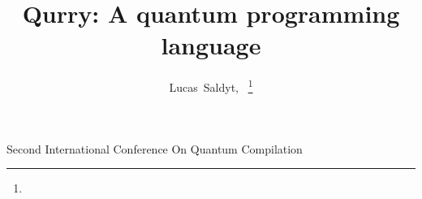 \documentclass[journal]{IEEEtran}
\begin{document}
%
\title{Qurry: A quantum programming language}
%
%
%

\author{Lucas~Saldyt,~
\thanks{}}

% 
%

%
{Second International Conference On Quantum Compilation}
% 
\end{document}
